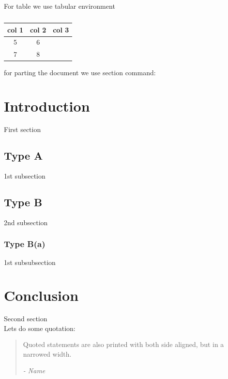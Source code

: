 \documentclass[a4paper,12pt]{article}
\begin{document}
For table we use tabular environment \\

\begin{table}[hbt!]
    \caption{} %
    \centering
    \begin{tabular}{|c|c|c|} %
        \hline
        col 1 & col 2 & col 3 \\ %
        \hline %
        5     & 6             \\ %
        \hline
        7     & 8             \\
        \hline
    \end{tabular}
\end{table}



for parting the document we use section command: \\
\section{Introduction}
First section
\subsection{Type A}
1st subsection
\subsection{Type B}
2nd subsection
\subsubsection{Type B(a)}
1st subsubsection
\section{Conclusion}
Second section\\



Lets do some quotation: \\
\begin{quotation}
    \begin{spacing}{1.2}
        Quoted statements are also printed with both side
        aligned, but in a narrowed width.
        \begin{flushright}
            {\it - Name}
        \end{flushright}
    \end{spacing}
\end{quotation}
\end{document}
